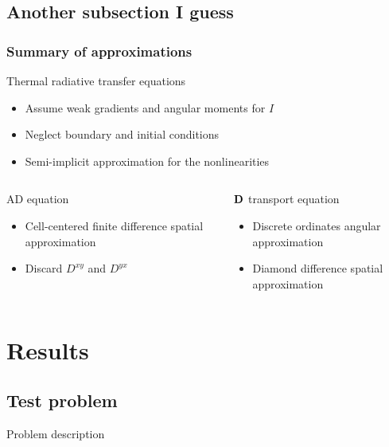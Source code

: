 \documentclass{beamer}
\newcommand{\Dtens}{\mat{D}}
\begin{document}
\subsection{Another subsection I guess}
\begin{frame}
  \frametitle{Summary of approximations}
  \begin{block}{Thermal radiative transfer equations}
    \begin{itemize}
      \item Assume weak gradients and angular moments for $I$
      \item Neglect boundary and initial conditions
      \item Semi-implicit approximation for the nonlinearities
    \end{itemize}
  \end{block}
  \begin{columns}[t]
    \begin{column}{.48\textwidth}
  \begin{block}{AD equation}
    \begin{itemize}
      \item Cell-centered finite difference spatial approximation
      \item Discard $D^{xy}$ and $D^{yx}$
    \end{itemize}
  \end{block}
    \end{column}
    \begin{column}{.48\textwidth}
  \begin{block}{$\Dtens$ transport equation}
    \begin{itemize}
      \item Discrete ordinates angular approximation
      \item Diamond difference spatial approximation
    \end{itemize}
  \end{block}
    \end{column}
  \end{columns}
\end{frame}
\section{Results}
\subsection{Test problem}
\begin{frame}{Problem description}
\end{frame}
\end{document}

